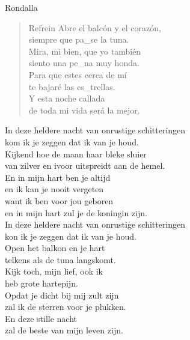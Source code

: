 \begin{song}[vals]{Rondalla}
\begin{verse}{Refrein}
Abre el balcón y el corazón,\\
siempre que pa\_se \hspace{1em}\hspace{1em} la tuna.\\
\chord{}Mira, mi bien, que yo tambi\'{e}n\\
siento una pe\_na \hspace{1em}\hspace{1em} muy honda.\\
\chord{}Para que estes cerca de m\'{i}\\
te bajar\'{e} las es\_trellas.\\
Y esta noche callada\\
de toda mi vida ser\'{a} la mejor.\hspace{4em} 
\end{verse}

\end{song}

\clearpage
\begin{translation}
In deze heldere nacht van onrustige schitteringen\\
kom ik je zeggen dat ik van je houd.\\
Kijkend hoe de maan haar bleke sluier\\
van zilver en ivoor uitspreidt aan de hemel.\\\vspace{1em}
En in mijn hart ben je altijd\\
en ik kan je nooit vergeten\\
want ik ben voor jou geboren\\
en in mijn hart zul je de koningin zijn.\\\vspace{1em}
In deze heldere nacht van onrustige schitteringen\\
kon ik je zeggen dat ik van je houd.\\\vspace{1em}
Open het balkon en je hart\\
telkens als de tuna langskomt.\\
Kijk toch, mijn lief, ook ik\\
heb grote hartepijn.\\
Opdat je dicht bij mij zult zijn\\
zal ik de sterren voor je plukken.\\
En deze stille nacht\\
zal de beste van mijn leven zijn.
\end{translation}
